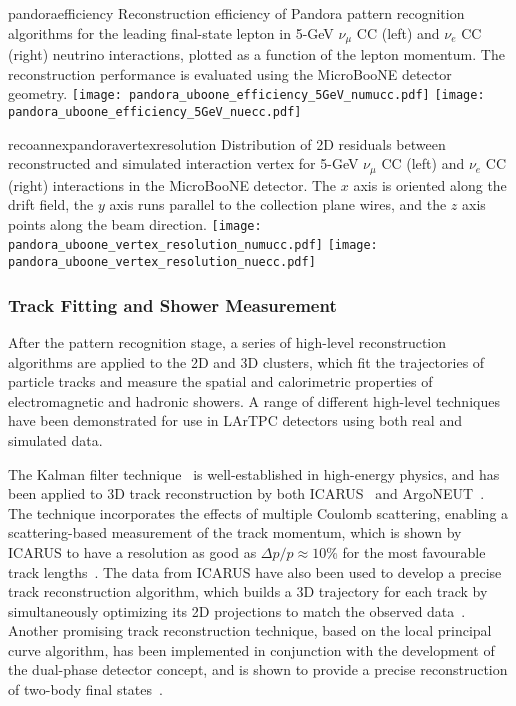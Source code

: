\begin{cdrfigure}{pandoraefficiency}
{Reconstruction efficiency of Pandora pattern recognition algorithms
 for the leading final-state lepton in 5-GeV $\nu_{\mu}$ CC (left) and
 $\nu_{e}$ CC (right) neutrino interactions, plotted as a function of
 the lepton momentum. The reconstruction performance is evaluated
 using the MicroBooNE detector geometry. }
\texttt{[image: pandora\_uboone\_efficiency\_5GeV\_numucc.pdf]}
\texttt{[image: pandora\_uboone\_efficiency\_5GeV\_nuecc.pdf]}
\end{cdrfigure}

\begin{cdrfigure}{recoannexpandoravertexresolution}
{Distribution of 2D residuals between reconstructed and simulated interaction
 vertex for 5-GeV $\nu_{\mu}$ CC (left) and $\nu_{e}$ CC (right) interactions in the MicroBooNE detector.
 The $x$ axis is oriented along the drift field, the $y$ axis runs parallel 
 to the collection plane wires, and the $z$ axis points along the beam direction.}
\texttt{[image: pandora\_uboone\_vertex\_resolution\_numucc.pdf]}
\texttt{[image: pandora\_uboone\_vertex\_resolution\_nuecc.pdf]}
\end{cdrfigure}

\subsubsection{Track Fitting and Shower Measurement}


After the pattern recognition stage, a series of high-level reconstruction
algorithms are applied to the 2D and 3D clusters,
which fit the trajectories of particle tracks and measure the
spatial and calorimetric properties of electromagnetic and hadronic showers.
A range of different high-level techniques have been demonstrated 
for use in LArTPC detectors using both real and simulated data.

The Kalman filter technique~\cite{kalman} is well-established in high-energy physics,
and has been applied to 3D track reconstruction by both ICARUS~\cite{Ankowski:2006ts} and ArgoNEUT~\cite{REF}.
The technique incorporates the effects of multiple Coulomb scattering,
enabling a scattering-based measurement of the track momentum,
which is shown by ICARUS to have a resolution as good as $\Delta p/p \approx 10\%$ 
for the most favourable track lengths~\cite{Ankowski:2006ts}.
The data from ICARUS have also been used to develop a precise
track reconstruction algorithm, which builds a 3D trajectory for each track by simultaneously
optimizing its 2D projections to match the observed data~\cite{Antonello:2012hu}.
Another promising track reconstruction technique, based on the local principal curve algorithm,
has been implemented in conjunction with the development of the 
dual-phase detector concept, and is shown to provide 
a precise reconstruction of two-body final states~\cite{Back:2013cva,LAGUNA-LBNO-deliv}. 

